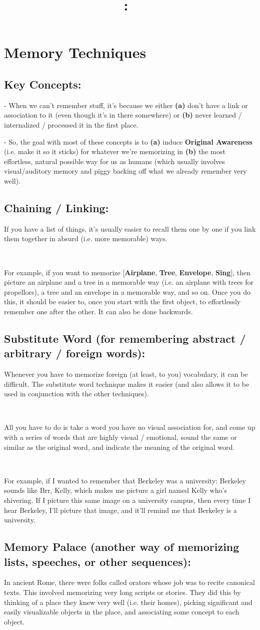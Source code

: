 \documentclass{article}
\title{
    \vspace{2in}
    \textmd{\textbf{\hmwkClass:\ \hmwkTitle}}\\
    \normalsize\vspace{0.1in}\small\vspace{0.1in}\large{\textit{\hmwkClassInstructor}}
    \vspace{3in}
}
\author{\hmwkAuthorName}
\date{}
\newcommand\bsc[2][\DefaultOpt]{%
  \def\DefaultOpt{#2}%
  \section[#1]{#2}%
}
\newcommand\ssc[2][\DefaultOpt]{%
  \def\DefaultOpt{#2}%
  \subsection[#1]{#2}%
}
\newcommand{\bpth}[1]{\textbf{(#1)}}
\begin{document}
\bsc{Memory Techniques}{

\ssc{Key Concepts:}{
- When we can't remember stuff, it's because we either \bpth{a} don't have a link or association to it (even though it's in there somewhere) or \bpth{b} never learned / internalized / processed it in the first place.

- So, the goal with most of these concepts is to \bpth{a} induce \textbf{Original Awareness} (i.e. make it so it sticks) for whatever we're memorizing in \bpth{b} the most effortless, natural possible way for us as humans (which usually involves visual/auditory memory and piggy backing off what we already remember very well).

}
\ssc{Chaining / Linking:}{
If you have a list of things, it's usually easier to recall them one by one if you link them together in absurd (i.e. more memorable) ways.

\

For example, if you want to memorize [\textbf{Airplane}, \textbf{Tree}, \textbf{Envelope}, \textbf{Sing}], then picture an airplane and a tree in a memorable way (i.e. an airplane with trees for propellors), a tree and an envelope in a memorable way, and so on. Once you do this, it should be easier to, once you start with the first object, to effortlessly remember one after the other. It can also be done backwards.

}

\ssc{Substitute Word (for remembering abstract / arbitrary / foreign words):}{
Whenever you have to memorize foreign (at least, to you) vocabulary, it can be difficult. The substitute word technique makes it easier (and also allows it to be used in conjunction with the other techniques).

\

All you have to do is take a word you have no visual association for, and come up with a series of words that are highly visual / emotional, sound the same or similar as the original word, and indicate the meaning of the original word.

\

For example, if I wanted to remember that Berkeley was a university: Berkeley sounds like Brr, Kelly, which makes me picture a girl named Kelly who's shivering. If I picture this same image on a university campus, then every time I hear Berkeley, I'll picture that image, and it'll remind me that Berkeley is a university.
}

\ssc{Memory Palace (another way of memorizing lists, speeches, or other sequences):}{
In ancient Rome, there were folks called orators whose job was to recite canonical texts. This involved memorizing very long scripts or stories. They did this by thinking of a place they knew very well (i.e. their homes), picking significant and easily visualizable objects in the place, and associating some concept to each object.

}}
\end{document}
